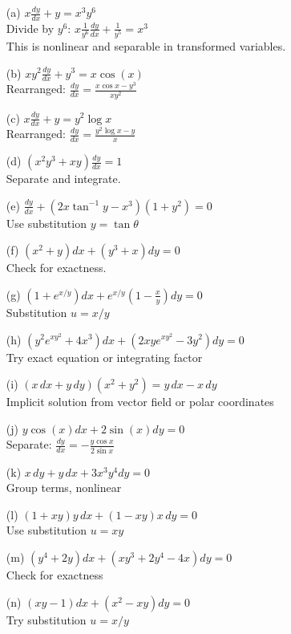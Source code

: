 \documentclass[12pt]{article}
\begin{document}
\begin{enumerate}
  \item[(a)] \( x \frac{dy}{dx} + y = x^3 y^6 \)\\
  Divide by \( y^6 \): \quad \( x \frac{1}{y^6} \frac{dy}{dx} + \frac{1}{y^5} = x^3 \)\\
  This is nonlinear and separable in transformed variables.

  \item[(b)] \( x y^2 \frac{dy}{dx} + y^3 = x \cos(x) \)\\
  Rearranged: \( \frac{dy}{dx} = \frac{x \cos x - y^3}{x y^2} \)

  \item[(c)] \( x \frac{dy}{dx} + y = y^2 \log x \)\\
  Rearranged: \( \frac{dy}{dx} = \frac{y^2 \log x - y}{x} \)

  \item[(d)] \( (x^2 y^3 + x y) \frac{dy}{dx} = 1 \)\\
  Separate and integrate.

  \item[(e)] \( \frac{dy}{dx} + (2x \tan^{-1} y - x^3)(1 + y^2) = 0 \)\\
  Use substitution \( y = \tan \theta \)

  \item[(f)] \( (x^2 + y)dx + (y^3 + x)dy = 0 \)\\
  Check for exactness.

  \item[(g)] \( (1 + e^{x/y})dx + e^{x/y}(1 - \frac{x}{y})dy = 0 \)\\
  Substitution \( u = x/y \)

  \item[(h)] \( (y^2 e^{x y^2} + 4x^3)dx + (2x y e^{x y^2} - 3y^2)dy = 0 \)\\
  Try exact equation or integrating factor

  \item[(i)] \( (x\,dx + y\,dy)(x^2 + y^2) = y\,dx - x\,dy \)\\
  Implicit solution from vector field or polar coordinates

  \item[(j)] \( y \cos(x)dx + 2 \sin(x)dy = 0 \)\\
  Separate: \( \frac{dy}{dx} = -\frac{y \cos x}{2 \sin x} \)

  \item[(k)] \( x\,dy + y\,dx + 3x^3 y^4 dy = 0 \)\\
  Group terms, nonlinear

  \item[(l)] \( (1 + xy)y\,dx + (1 - xy)x\,dy = 0 \)\\
  Use substitution \( u = xy \)

  \item[(m)] \( (y^4 + 2y)dx + (x y^3 + 2y^4 - 4x)dy = 0 \)\\
  Check for exactness

  \item[(n)] \( (xy - 1)dx + (x^2 - xy)dy = 0 \)\\
  Try substitution \( u = x/y \)
\end{enumerate}
\end{document}
